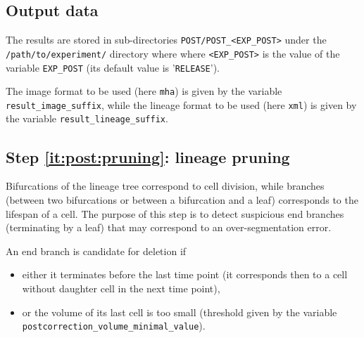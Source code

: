 \subsection{Output data}

The results are stored in sub-directories
\texttt{POST/POST\_<EXP\_POST>} under the
\texttt{/path/to/experiment/} directory where where \texttt{<EXP\_POST>} is the value of the variable \texttt{EXP\_POST} (its
default value is '\texttt{RELEASE}'). 


The image format to be used (here \verb|mha|) is given by the variable \texttt{result\_image\_suffix}, while the lineage format to be used (here \verb|xml|) is given by the variable \texttt{result\_lineage\_suffix}.





\subsection{Step \ref{it:post:pruning}: lineage pruning}
\label{sec:cli:post:correction:pruning}

Bifurcations of the lineage tree correspond to cell division, while branches (between two bifurcations or between a bifurcation and a leaf) corresponds to the lifespan of a cell.
The purpose of this step is to detect suspicious end branches (terminating by a leaf) that may correspond to an over-segmentation error. 

An end branch is candidate for deletion if
\begin{itemize}
\itemsep -0.5ex
\item either it terminates before the last time point (it corresponds then to a cell without daughter cell in the next time point), 
\item or the volume of its last cell is too small (threshold given by the variable \texttt{postcorrection\_volume\_minimal\_value}).
\end{itemize}

